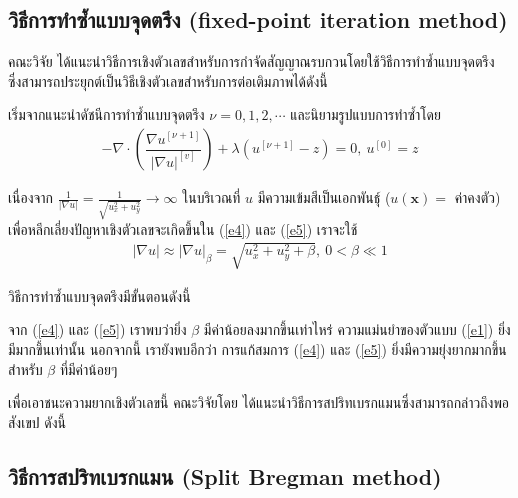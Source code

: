 \subsection{วิธีการทำซ้ำแบบจุดตรึง (fixed-point iteration method) }

\hspace{1cm} คณะวิจัย \cite{ref:FixpointSolver} ได้แนะนำวิธีการเชิงตัวเลขสำหรับการกำจัดสัญญาณรบกวนโดยใช้วิธีการทำซ้ำแบบจุดตรึง ซึ่งสามารถประยุกต์เป็นวิธีเชิงตัวเลขสำหรับการต่อเติมภาพได้ดังนี้
	
\hspace{1cm} เริ่มจากแนะนำดัชนีการทำซ้ำแบบจุดตรึง $\nu=0,1,2,\cdots$ และนิยามรูปแบบการทำซ้ำโดย
\begin{align}
	- \nabla\cdot\left(\dfrac{\nabla u^{[\nu+1]}}{{| \nabla u |}^{[v]} }\right) + \lambda(u^{[\nu+1]}-z)  = 0,\ u^{[0]}=z
	\label{e5}
\end{align}

\hspace{1cm} เนื่องจาก $\tfrac{1}{| \nabla u |}=\tfrac{1}{\sqrt{u_x^2+u_y^2}} \rightarrow \infty$ ในบริเวณที่ $u$ มีความเข้มสีเป็นเอกพันธ์ุ ($u(\mathbf{x})=$ ค่าคงตัว) เพื่อหลีกเลี่ยงปัญหาเชิงตัวเลขจะเกิดขึ้นใน (\ref{e4}) และ (\ref{e5}) เราจะใช้ 
\begin{align*}
|\nabla u| \approx| \nabla u |_\beta=\sqrt{u_x^2+u_y^2+\beta},\ 0< \beta \ll 1
 \end{align*}

\hspace{1cm}วิธีการทำซ้ำแบบจุดตรึงมีขั้นตอนดังนี้ \\
\vspace{0.5cm} 

\vspace{0.5cm}
\hspace{1cm} จาก (\ref{e4}) และ (\ref{e5}) เราพบว่ายิ่ง $\beta$ มีค่าน้อยลงมากขึ้นเท่าไหร่ ความแม่นยำของตัวแบบ (\ref{e1}) ยิ่งมีมากขึ้นเท่านั้น นอกจากนี้ เรายังพบอีกว่า การแก้สมการ (\ref{e4}) และ (\ref{e5}) ยิ่งมีความยุ่งยากมากขึ้นสำหรับ $\beta$ ที่มีค่าน้อยๆ 

\hspace{1cm} เพื่อเอาชนะความยากเชิงตัวเลขนี้ คณะวิจัยโดย \cite{ref:splitbergman-inpaint} ได้แนะนำวิธีการสปริทเบรกแมนซึ่งสามารถกล่าวถึงพอสังเขป ดังนี้

\subsection{วิธีการสปริทเบรกแมน (Split Bregman method)}

